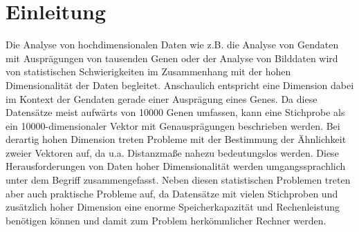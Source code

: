 \chapter{Einleitung}
\label{ch:Enleitung}

Die Analyse von hochdimensionalen Daten wie z.B. die Analyse von Gendaten mit Ausprägungen von
tausenden Genen \parencite[siehe z.B.][]{Parmigiani.2003} oder der Analyse von Bilddaten wird von statistischen
Schwierigkeiten im Zusammenhang mit der hohen Dimensionalität der Daten begleitet. Anschaulich
entspricht eine Dimension dabei im Kontext der Gendaten gerade einer Ausprägung eines Genes. Da
diese Datensätze meist aufwärts von \num{10000} Genen umfassen, kann eine Stichprobe als ein
\num{10000}-dimensionaler Vektor mit Genausprägungen beschrieben werden. Bei derartig hohen
Dimension treten Probleme mit der Bestimmung der Ähnlichkeit zweier Vektoren auf, da u.a.
Distanzmaße nahezu bedeutungslos werden. Diese Herausforderungen von Daten hoher Dimensionalität
werden umgangssprachlich unter dem Begriff  \parencite{Bellman.1961} zusammengefasst. Neben diesen statistischen Problemen treten aber auch
praktische Probleme auf, da Datensätze mit vielen Stichproben und zusätzlich hoher Dimension eine
enorme Speicherkapazität und Rechenleistung benötigen können und damit zum Problem herkömmlicher
Rechner werden.

